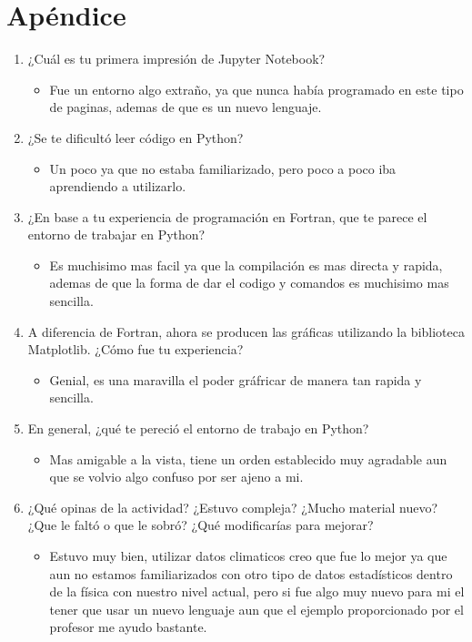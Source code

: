 \documentclass[12pt,letterpaper]{article}
\begin{document}
  	\section{Apéndice}
\begin{enumerate}

	\item ¿Cuál es tu primera impresión de Jupyter Notebook? \par
		\begin{itemize}
			\item Fue un entorno algo extraño, ya que nunca había programado en este tipo de paginas, ademas de que es un nuevo lenguaje.
		\end{itemize}
	\item ¿Se te dificultó leer código en Python? \par
		\begin{itemize}
			\item Un poco ya que no estaba familiarizado, pero poco a poco iba aprendiendo a utilizarlo.
		\end{itemize}
	\item ¿En base a tu experiencia de programación en Fortran, que te parece el entorno de 		trabajar en Python? \par
		\begin{itemize}
			\item Es muchisimo mas facil ya que la compilación es mas directa y rapida, ademas de que la forma de dar el codigo y comandos es muchisimo mas sencilla.
		\end{itemize}
	\item A diferencia de Fortran, ahora se producen las gráficas utilizando la biblioteca 			Matplotlib. ¿Cómo fue tu experiencia? \par
		\begin{itemize}
			\item Genial, es una maravilla el poder gráfricar de manera tan rapida y sencilla.
		\end{itemize}
	\item En general, ¿qué te pereció el entorno de trabajo en Python? \par
		\begin{itemize}
			\item Mas amigable a la vista, tiene un orden establecido muy agradable aun que se volvio algo confuso por ser ajeno a mi. 
		\end{itemize}
	\item¿Qué opinas de la actividad? ¿Estuvo compleja? ¿Mucho material nuevo? ¿Que le faltó o que le sobró? ¿Qué modificarías para mejorar? \par
    	\begin{itemize}
    	\item Estuvo muy bien, utilizar datos climaticos creo que fue lo mejor ya que aun no estamos familiarizados con otro tipo de datos estadísticos dentro de la física con nuestro nivel actual, pero si fue algo muy nuevo para mi el tener que usar un nuevo lenguaje aun que el ejemplo proporcionado por el profesor me ayudo bastante.
    	\end{itemize}
\end{enumerate}
   
\end{document}

